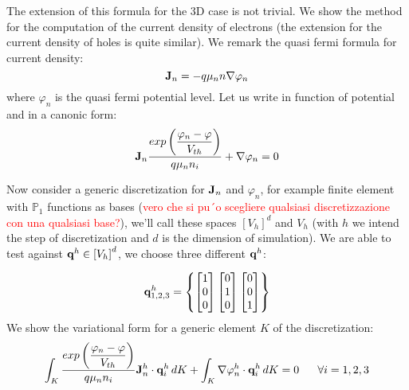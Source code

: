 The extension of this formula for the 3D case is not trivial. We show the method for the computation of the current density of electrons (the extension for the current density of holes is quite similar).
We remark the quasi fermi formula for current density:
\begin{equation}
\label{eq: current density fermi}
\mathbf{J}_n=-q \mu_n n \nabla \varphi_n
\end{equation}
where $\varphi_n$ is the quasi fermi potential level. Let us write  in function of potential and in a canonic form:
\begin{equation}
\label{eq: current density canonic form}
\mathbf{J}_n\dfrac{ exp\left(\dfrac{\varphi_n-\varphi}{V_{th}}\right)}{q \mu_n n_i} + \nabla \varphi_n = 0
\end{equation}

Now consider a generic discretization for $\mathbf{J}_n$ and $\varphi_n$, for example finite element with $\mathbb{P}_1$ functions as bases (\textcolor{red}{vero che si pu´o scegliere qualsiasi discretizzazione con una qualsiasi base?}), we'll call these spaces $\left[ V_h \right]^d$ and $V_h$ (with $h$ we intend the step of discretization and $d$ is the dimension of simulation). We are able to test  against $\mathbf{q}^h \in \left[ V_h \right]^d$, we choose three  different $\mathbf{q}^h$:

\begin{equation}
\label{eq: form of qh}
\mathbf{q}^h_{1,2,3} = \left\{ \begin{bmatrix} 1 \\ 0 \\ 0 \end{bmatrix}  \begin{bmatrix} 0 \\ 1 \\ 0 \end{bmatrix}  \begin{bmatrix} 0 \\ 0 \\ 1 \end{bmatrix}  \right\}
\end{equation}
We show the variational form for a generic element $K$ of the discretization:
\begin{equation}
\label{eq: variation form of current density}
\int_K \dfrac{ exp \left( \dfrac{\varphi_n-\varphi}{V_{th}} \right) }{q \mu_n n_i} \vect{J}_n^h \cdot \vect{q}^h_i \, dK
 + \int_K \nabla \varphi_n^h \cdot \vect{q}^h_i \, dK = 0 \psp{10} \forall i=1,2,3
\end{equation}

